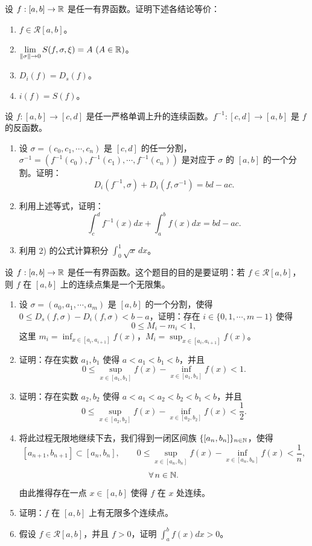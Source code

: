 \begin{exercise}
	\item 设 \(f:[a,b]\to\mathbb{R}\) 是任一有界函数。证明下述各结论等价：
	\begin{enumerate}[label=\arabic*)]
		\item \(f\in\mathscr{R}[a,b]\)。
		\item \(\displaystyle\lim_{\|\sigma\|\to0}S(f,\sigma,\xi)=A\ (A\in\R)\)。
		\item \(D_i(f)=D_s(f)\)。
		\item \(i(f)=S(f)\)。
	\end{enumerate}
\end{exercise}

\begin{exercise}
	\item 设 \(f:[a,b]\to[c,d]\) 是任一严格单调上升的连续函数。\(f^{-1}:[c,d]\to[a,b]\) 是 \(f\) 的反函数。
	\begin{enumerate}[label=\arabic*)]
		\item 设 \(\sigma=(c_0,c_1,\cdots,c_n)\) 是 \([c,d]\) 的任一分割，\(\sigma^{-1}=(f^{-1}(c_0),f^{-1}(c_1),\cdots,f^{-1}(c_n))\) 是对应于 \(\sigma\) 的 \([a,b]\) 的一个分割。证明：
		\[
		D_i(f^{-1},\sigma)+D_i(f,\sigma^{-1})=bd-ac.
		\]
		\item 利用上述等式，证明：
		\[
		\int_c^d f^{-1}(x)dx+\int_a^b f(x)dx=bd-ac.
		\]
		\item 利用 2) 的公式计算积分 \(\displaystyle\int_0^1\sqrt x\,dx\)。
	\end{enumerate}
\end{exercise}

\begin{exercise}
	\item 设 \(f:[a,b]\to\mathbb{R}\) 是任一有界函数。这个题目的目的是要证明：若 \(f\in\mathscr{R}[a,b]\)，则 \(f\) 在 \([a,b]\) 上的连续点集是一个无限集。
	\begin{enumerate}[label=\arabic*)]
		\item 设 \(\sigma=(a_0,a_1,\cdots,a_m)\) 是 \([a,b]\) 的一个分割，使得 \(0\le D_s(f,\sigma)-D_i(f,\sigma)<b-a\)，证明：存在 \(i\in\{0,1,\cdots,m-1\}\) 使得
		\[
		0\le M_i-m_i<1,
		\]
		这里 \(m_i=\inf_{x\in[a_i,a_{i+1}]}f(x)\)，\(M_i=\sup_{x\in[a_i,a_{i+1}]}f(x)\)。
		\item 证明：存在实数 \(a_1,b_1\) 使得 \(a<a_1<b_1<b\)，并且
		\[
		0\le\sup_{x\in[a_1,b_1]}f(x)-\inf_{x\in[a_1,b_1]}f(x)<1.
		\]
		\item 证明：存在实数 \(a_2,b_2\) 使得 \(a<a_1<a_2<b_2<b_1<b\)，并且
		\[
		0\le\sup_{x\in[a_2,b_2]}f(x)-\inf_{x\in[a_2,b_2]}f(x)<\frac12.
		\]
		\item 将此过程无限地继续下去，我们得到一闭区间族 \(\{[a_n,b_n]\}_{n\in\mathbb{N}}\)，使得
		\[
		[a_{n+1},b_{n+1}]\subset[a_n,b_n],\qquad 0\le\sup_{x\in[a_n,b_n]}f(x)-\inf_{x\in[a_n,b_n]}f(x)<\frac1n,
		\]
		\[
		\forall\,n\in\mathbb{N}.
		\]
		由此推得存在一点 \(x\in[a,b]\) 使得 \(f\) 在 \(x\) 处连续。
		\item 证明：\(f\) 在 \([a,b]\) 上有无限多个连续点。
		\item 假设 \(f\in\mathscr{R}[a,b]\)，并且 \(f>0\)，证明 \(\displaystyle\int_a^b f(x)dx>0\)。
	\end{enumerate}
\end{exercise}

